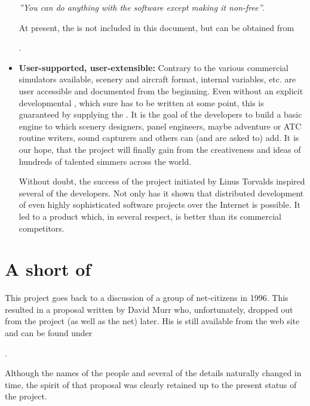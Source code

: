 \begin{itemize}
\centerline{\textit{''You can do anything with the software except
making it non-free''}.}

At present, the  is not included in this
document, but can be obtained from

.

\item\textbf{User-supported, user-extensible:}
  Contrary to the various
  commercial simulators available, scenery and aircraft format,
  internal variables, etc. are user accessible and documented
  from the beginning. Even without an explicit developmental ,
  which sure has to be written at some point, this is guaranteed by supplying the
  . It is the goal of the developers to build a basic
  engine to which scenery designers, panel engineers, maybe adventure
  or ATC routine writers, sound capturers and others can (and are asked to)
  add. It is our hope, that the project will finally gain from the creativeness
  and ideas of hundreds of talented simmers across the world.

  Without doubt, the success of the  project initiated by Linus
  Torvalds inspired several of the developers.
  Not only has it shown that distributed development of even highly sophisticated
  software projects over the Internet is possible. It led to a product which,
  in several respect, is better than its commercial competitors.
\end{itemize}

\section{A short  of \FlightGear}

This project goes back to a discussion of a group of net-citizens
in 1996. This resulted in a proposal written by David
Murr who, unfortunately, dropped out from the
project (as well as the net) later. His  is still
available from the \FlightGear web site and can be found under

.

Although the names of the people and several of the details
naturally changed in time, the spirit of that proposal was clearly
retained up to the present status of the project.

